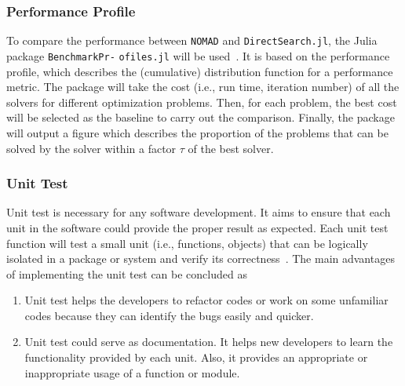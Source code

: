 \documentclass[11pt,oneside,onecolumn,openright]{article}
\begin{document}
  \subsubsection*{Performance Profile}
  To compare the performance between \verb|NOMAD| and \verb|DirectSearch.jl|, the Julia package \verb|BenchmarkPr-| \verb|ofiles.jl| will be used~\cite{dolan2002benchmarking}. It is based on the performance profile, which describes the (cumulative) distribution function for a performance metric. The package will take the cost (i.e., run time, iteration number) of all the solvers for different optimization problems. Then, for each problem, the best cost will be selected as the baseline to carry out the comparison. Finally, the package will output a figure which describes the proportion of the problems that can be solved by the solver within a factor $\tau$ of the best solver.
  \subsubsection*{Unit Test}
  Unit test is necessary for any software development. It aims to ensure that each unit in the software could provide the proper result as expected. Each unit test function will test a small unit (i.e., functions, objects) that can be logically isolated in a package or system and verify its correctness~\cite{zhu1997software}. The main advantages of implementing the unit test can be concluded as
  \begin{enumerate}
  \item Unit test helps the developers to refactor codes or work on some unfamiliar codes because they can identify the bugs easily and quicker.
  \item Unit test could serve as documentation. It helps new developers to learn the functionality provided by each unit. Also, it provides an appropriate or inappropriate usage of a function or module.
  \end{enumerate}
\end{document}
